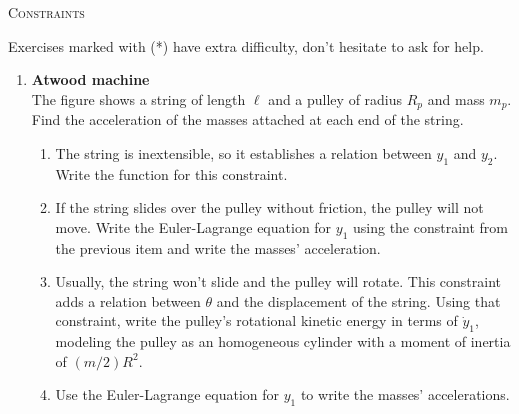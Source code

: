 \documentclass[11pt, a4paper, twoside]{article}
\begin{document}
\begin{center}
  \textsc{\large Constraints}
\end{center}

\noindent
Exercises marked with (*) have extra difficulty, don't hesitate to ask for help.

\begin{enumerate}

\item 
	\begin{minipage}[t][3cm]{0.72\textwidth}
		\textbf{Atwood machine}\\
		The figure shows a string of length \(\ell\) and a pulley of radius \(R_p\) and mass \(m_p\).
		Find the acceleration of the masses attached at each end of the string.
	\end{minipage}
	\begin{minipage}[c][3cm][t]{0.2\textwidth}
		
	\end{minipage}
		\begin{enumerate}
			\item The string is inextensible, so it establishes a relation between \(y_1\) and \(y_2\).
			Write the function for this constraint.
			\item If the string slides over the pulley without friction, the pulley will not move.
			Write the Euler-Lagrange equation for \(y_1\) using the constraint from the previous item and write the masses' acceleration.
			\item Usually, the string won't slide and the pulley will rotate.
			This constraint adds a relation between \(\theta\) and the displacement of the string.
			Using that constraint, write the pulley's rotational kinetic energy in terms of \(\dot{y}_1\), modeling the pulley as an homogeneous cylinder with a moment of inertia of \((m/2) R^2\).
			\item Use the Euler-Lagrange equation for \(y_1\) to write the masses' accelerations.
		\end{enumerate}
	

\end{enumerate}
\end{document}
